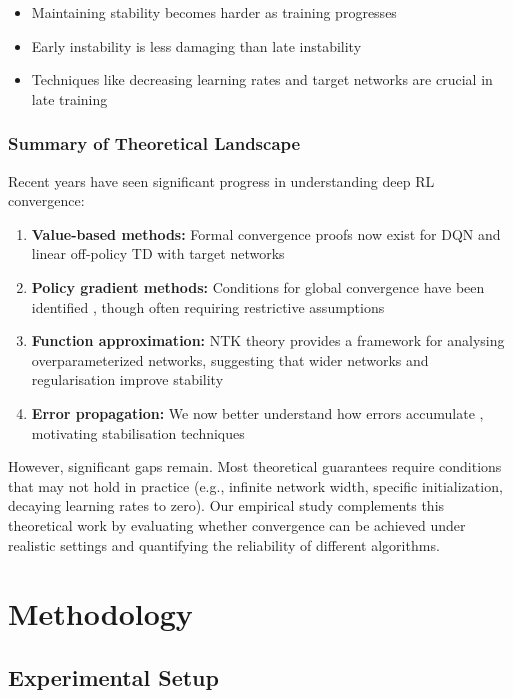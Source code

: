 \documentclass[12pt,a4paper]{report}
\begin{document}
\begin{itemize}
    \item Maintaining stability becomes harder as training progresses
    \item Early instability is less damaging than late instability
    \item Techniques like decreasing learning rates and target networks are crucial in late training
\end{itemize}

\subsection{Summary of Theoretical Landscape}

Recent years have seen significant progress in understanding deep RL convergence:

\begin{enumerate}
    \item \textbf{Value-based methods:} Formal convergence proofs now exist for DQN \cite{zhang2023convergence} and linear off-policy TD with target networks \cite{zhang2021breaking}
    \item \textbf{Policy gradient methods:} Conditions for global convergence have been identified \cite{wang2019neural}, though often requiring restrictive assumptions
    \item \textbf{Function approximation:} NTK theory \cite{cayci2021sample} provides a framework for analysing overparameterized networks, suggesting that wider networks and regularisation improve stability
    \item \textbf{Error propagation:} We now better understand how errors accumulate \cite{farahmand2010error}, motivating stabilisation techniques
\end{enumerate}

However, significant gaps remain. Most theoretical guarantees require conditions that may not hold in practice (e.g., infinite network width, specific initialization, decaying learning rates to zero). Our empirical study complements this theoretical work by evaluating whether convergence can be achieved under realistic settings and quantifying the reliability of different algorithms.

\chapter{Methodology}

\section{Experimental Setup}
\end{document}
